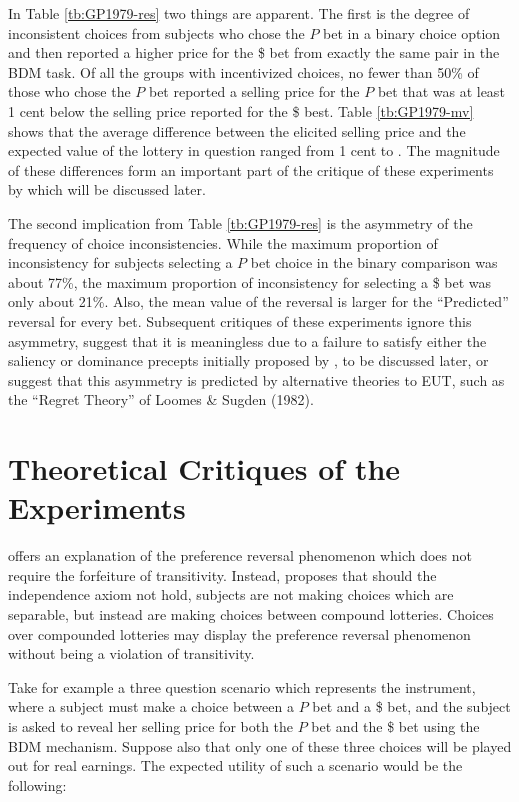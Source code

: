 \documentclass[../main.tex]{subfiles}
\begin{document}
In Table \ref{tb:GP1979-res} two things are apparent.
The first is the degree of inconsistent choices from subjects who chose the $P$ bet in a binary choice option and then reported a higher price for the {\$} bet from exactly the same pair in the BDM task.
Of all the groups with incentivized choices, no fewer than 50\% of those who chose the $P$ bet reported a selling price for the $P$ bet that was at least 1 cent below the selling price reported for the {\$} best.
Table \ref{tb:GP1979-mv} shows that the average difference between the elicited selling price and the expected value of the lottery in question ranged from 1 cent to .
The magnitude of these differences form an important part of the critique of these experiments by \textcite{Harrison1989, Harrison1992} which will be discussed later.

The second implication from Table \ref{tb:GP1979-res} is the asymmetry of the frequency of choice inconsistencies.
While the maximum proportion of inconsistency for subjects selecting a $P$ bet choice in the binary comparison was about 77\%, the maximum proportion of inconsistency for selecting a {\$} bet was only about 21\%.
Also, the  mean value of the reversal is larger for the \enquote{Predicted} reversal for every bet.
Subsequent critiques of these experiments ignore this asymmetry, suggest that it is meaningless due to a failure to satisfy either the saliency or dominance precepts initially proposed by \textcite{Smith1982}, to be discussed later, or suggest that this asymmetry is predicted by alternative theories to EUT, such as the \enquote{Regret Theory} of  Loomes \& Sugden (1982).

\section{Theoretical Critiques of the \texorpdfstring{\textcite{Grether1979}}{Grether \& Plott (1979)} Experiments}

\textcite{Holt1986} offers an explanation of the preference reversal phenomenon which does not require the forfeiture of transitivity.
Instead, \textcite{Holt1986} proposes that should the independence axiom not hold, subjects are not making choices which are separable, but instead are making choices between compound lotteries.
Choices over compounded lotteries may display the preference reversal phenomenon without being a violation of transitivity.

Take for example a three question scenario which represents the \textcite{Grether1979} instrument, where a subject must make a choice between a $P$ bet and a {\$} bet, and the subject is asked to reveal her selling price for both the $P$ bet and the {\$} bet using the BDM mechanism.
Suppose also that only one of these three choices will be played out for real earnings.
The expected utility of such a scenario would be the following:
\end{document}
